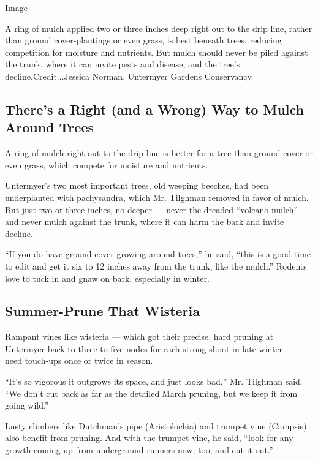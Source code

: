 Image

A ring of mulch applied two or three inches deep right out to the drip
line, rather than ground cover-plantings or even grass, is best beneath
trees, reducing competition for moisture and nutrients. But mulch should
never be piled against the trunk, where it can invite pests and disease,
and the tree's decline.Credit...Jessica Norman, Untermyer Gardens
Conservancy

\hypertarget{theres-a-right-and-a-wrong-way-to-mulch-around-trees}{%
\subsection{There's a Right (and a Wrong) Way to Mulch Around
Trees}\label{theres-a-right-and-a-wrong-way-to-mulch-around-trees}}

A ring of mulch right out to the drip line is better for a tree than
ground cover or even grass, which compete for moisture and nutrients.

Untermyer's two most important trees, old weeping beeches, had been
underplanted with pachysandra, which Mr. Tilghman removed in favor of
mulch. But just two or three inches, no deeper --- never
\href{https://bygl.osu.edu/node/1006}{the dreaded ``volcano mulch''} ---
and never mulch against the trunk, where it can harm the bark and invite
decline.

``If you do have ground cover growing around trees,'' he said, ``this is
a good time to edit and get it six to 12 inches away from the trunk,
like the mulch.'' Rodents love to tuck in and gnaw on bark, especially
in winter.

\hypertarget{summer-prune-that-wisteria}{%
\subsection{Summer-Prune That
Wisteria}\label{summer-prune-that-wisteria}}

Rampant vines like wisteria --- which got their precise, hard pruning at
Untermyer back to three to five nodes for each strong shoot in late
winter --- need touch-ups once or twice in season.

``It's so vigorous it outgrows its space, and just looks bad,'' Mr.
Tilghman said. ``We don't cut back as far as the detailed March pruning,
but we keep it from going wild.''

Lusty climbers like Dutchman's pipe (Aristolochia) and trumpet vine
(Campsis) also benefit from pruning. And with the trumpet vine, he said,
``look for any growth coming up from underground runners now, too, and
cut it out.''

